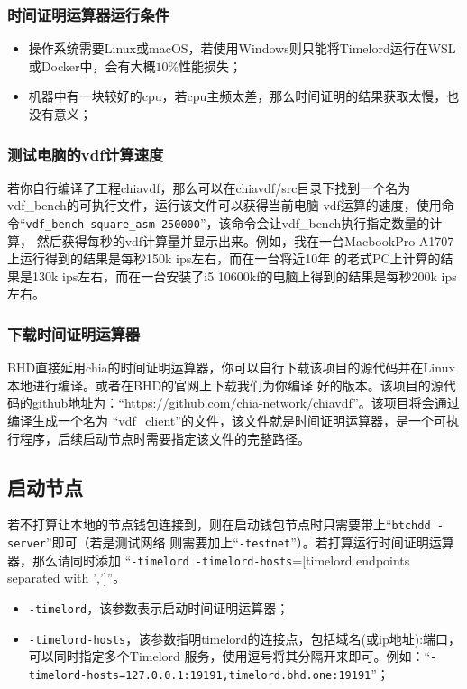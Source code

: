 \subsubsection{时间证明运算器运行条件}
\begin{itemize}
    \item 操作系统需要Linux或macOS，若使用Windows则只能将Timelord运行在WSL或Docker中，会有大概$10\%$性能损失；
    \item 机器中有一块较好的cpu，若cpu主频太差，那么时间证明的结果获取太慢，也没有意义；
\end{itemize}
\subsubsection{测试电脑的vdf计算速度}
\begin{flushleft}
    若你自行编译了工程chiavdf，那么可以在chiavdf/src目录下找到一个名为vdf\_bench的可执行文件，运行该文件可以获得当前电脑
    vdf运算的速度，使用命令``\texttt{vdf_bench square_asm 250000}''，该命令会让vdf\_bench执行指定数量的计算，
    然后获得每秒的vdf计算量并显示出来。例如，我在一台MacbookPro A1707上运行得到的结果是每秒150k ips左右，而在一台将近10年
    的老式PC上计算的结果是130k ips左右，而在一台安装了i5 10600kf的电脑上得到的结果是每秒200k ips左右。
\end{flushleft}
\subsubsection{下载时间证明运算器}
\begin{flushleft}
    BHD直接延用chia的时间证明运算器，你可以自行下载该项目的源代码并在Linux本地进行编译。或者在BHD的官网上下载我们为你编译
    好的版本。该项目的源代码的github地址为：``https://github.com/chia-network/chiavdf''。该项目将会通过编译生成一个名为
    ``vdf\_client''的文件，该文件就是时间证明运算器，是一个可执行程序，后续启动节点时需要指定该文件的完整路径。
\end{flushleft}
\subsection{启动节点}
\begin{flushleft}
    若不打算让本地的节点钱包连接到，则在启动钱包节点时只需要带上``\texttt{btchdd -server}''即可（若是测试网络
    则需要加上``\texttt{-testnet}''）。若打算运行时间证明运算器，那么请同时添加
    ``\texttt{-timelord -timelord-hosts}=[timelord endpoints separated with ',']''。
\end{flushleft}
\begin{itemize}
    \item \texttt{-timelord}，该参数表示启动时间证明运算器；
    \item \texttt{-timelord-hosts}，该参数指明timelord的连接点，包括域名(或ip地址):端口，可以同时指定多个Timelord
        服务，使用逗号将其分隔开来即可。例如：``\texttt{-timelord-hosts=127.0.0.1:19191,timelord.bhd.one:19191}''；
\end{itemize}

